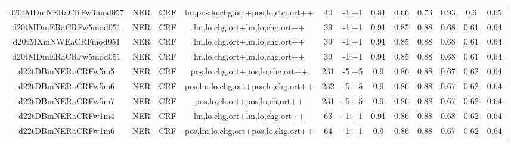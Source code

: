 \documentclass[a4paper]{article}
\begin{document}
\begin{landscape}
\begin{center}
\begin{tabular}{ |c|c|c|c|c|c|c|c|c|c|c|c|}
 
 	
 	\small{ d20tMDmNERaCRFw3mod057 } & \small{ NER} & \small{  CRF }  & lm,pos,lo,chg,ort+pos,lo,chg,ort++  &  40 &  \small{  -1:+1 }  &  0.81 & 0.66 & 0.73  &  0.93 & 0.6 & 0.65 \\
 	

 
 	
 	\small{ d20tMDmERaCRFw5mod051 } & \small{ NER} & \small{  CRF }  & lm,lo,chg,ort+lm,lo,chg,ort++  &  39 &  \small{  -1:+1 }  &  0.91 & 0.85 & 0.88  &  0.68 & 0.61 & 0.64 \\
 	

 
 	
 	\small{ d20tMXmNWEaCRFmod051 } & \small{ NER} & \small{  CRF }  & lm,lo,chg,ort+lm,lo,chg,ort++  &  39 &  \small{  -1:+1 }  &  0.91 & 0.85 & 0.88  &  0.68 & 0.61 & 0.64 \\
 	

 
 	
 	\small{ d20tMDmERaCRFw5mod051 } & \small{ NER} & \small{  CRF }  & lm,lo,chg,ort+lm,lo,chg,ort++  &  39 &  \small{  -1:+1 }  &  0.91 & 0.85 & 0.88  &  0.68 & 0.61 & 0.64 \\
 	

 
 	
 	\small{ d22tDBmNERaCRFw5m5 } & \small{ NER} & \small{  CRF }  & pos,lo,chg,ort+pos,lo,chg,ort++  &  231 &  \small{  -5:+5 }  &  0.9 & 0.86 & 0.88  &  0.67 & 0.62 & 0.64 \\
 	

 
 	
 	\small{ d22tDBmNERaCRFw5m6 } & \small{ NER} & \small{  CRF }  & pos,lm,lo,chg,ort+pos,lo,chg,ort++  &  232 &  \small{  -5:+5 }  &  0.9 & 0.86 & 0.88  &  0.67 & 0.62 & 0.64 \\
 	

 
 	
 	\small{ d22tDBmNERaCRFw5m7 } & \small{ NER} & \small{  CRF }  & pos,lo,ch,ort+pos,lo,ch,ort++  &  231 &  \small{  -5:+5 }  &  0.9 & 0.86 & 0.88  &  0.67 & 0.62 & 0.64 \\
 	

 
 	
 	\small{ d22tDBmNERaCRFw1m4 } & \small{ NER} & \small{  CRF }  & lm,lo,chg,ort+lm,lo,chg,ort++  &  63 &  \small{  -1:+1 }  &  0.91 & 0.86 & 0.88  &  0.68 & 0.62 & 0.64 \\
 	

 
 	
 	\small{ d22tDBmNERaCRFw1m6 } & \small{ NER} & \small{  CRF }  & pos,lm,lo,chg,ort+pos,lo,chg,ort++  &  64 &  \small{  -1:+1 }  &  0.9 & 0.86 & 0.88  &  0.67 & 0.62 & 0.64 \\
 	


\end{tabular}
\end{center}
\end{landscape}
\end{document}
